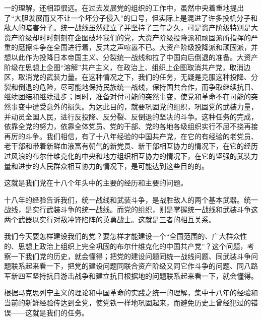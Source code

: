 一的理解，还相距很远。在过去发展党的组织的工作中，虽然中央着重地提出了“大胆发展而又不让一个坏分子侵入”的口号，但实际上是混进了许多投机分子和敌人的暗害分子。统一战线虽然建立了并坚持了三年之久，可是资产阶级特别是大资产阶级却时时刻刻在企图破坏我们的党，大资产阶级投降派和顽固派所指挥的严重的磨擦斗争在全国进行着，反共之声喧嚣不已。大资产阶级投降派和顽固派，并想以此作为投降日本帝国主义、分裂统一战线和拉了中国向后倒退的准备。大资产阶级在思想上企图“溶解”共产主义，在政治上、组织上企图取消共产党，取消边区，取消党的武装力量。在这种情况之下，我们的任务，无疑是克服这种投降、分裂和倒退的危险，尽可能地保持民族统一战线，保持国共合作，而争取继续抗日、继续团结和继续进步；同时，准备对付可能的突然事变，使党和革命不在可能的突然事变中遭受意外的损失。为达此目的，就要巩固党的组织，巩固党的武装力量，并动员全国人民，进行反投降、反分裂、反倒退的坚决的斗争。这种任务的完成，依靠全党的努力，依靠全体党员、党的干部、党的各地各级组织实行不屈不挠再接再厉的斗争。我们相信，有了十八年经验的中国共产党，在它的有经验的老党员、老干部和带着新鲜血液富有朝气的新党员、新干部相互协力的情况下，在它的经历过风浪的布尔什维克化的中央和地方组织相互协力的情况下，在它的坚强的武装力量和进步的人民群众相互协力的情况下，是可能达到这些目的的。

这就是我们党在十八个年头中的主要的经历和主要的问题。

十八年的经验告诉我们，统一战线和武装斗争，是战胜敌人的两个基本武器。统一战线，是实行武装斗争的统一战线。而党的组织，则是掌握统一战线和武装斗争这两个武器以实行对敌冲锋陷阵的英勇战士。这就是三者的相互关系。

我们今天要怎样建设我们的党？要怎样才能建设一个“全国范围的、广大群众性的、思想上政治上组织上完全巩固的布尔什维克化的中国共产党”？这个问题，考察一下我们党的历史，就会懂得；把党的建设问题同统一战线问题、同武装斗争问题联系起来看一下，把党的建设问题同联合资产阶级又同它作斗争的问题、同八路军新四军坚持抗日游击战争和建立抗日根据地的问题联系起来看一下，就会懂得。

根据马克思列宁主义的理论和中国革命的实践之统一的理解，集中十八年的经验和当前的新鲜经验传达到全党，使党铁一样地巩固起来，而避免历史上曾经犯过的错误——这就是我们的任务。


